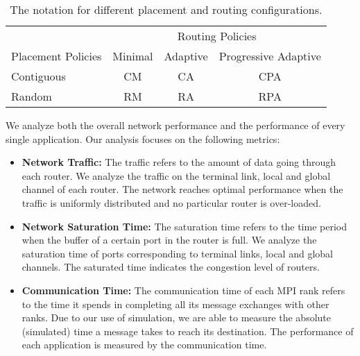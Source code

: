 
\begin{table}[ht]
\begin{center}
\caption{The notation for different placement and routing configurations.} 
\label{tab: placement routing configs}
\begin{tabular}{l c c c }
\toprule %
\toprule
&\multicolumn{3}{c}{Routing Policies} \\ 
\cmidrule(l){2-4}
Placement Policies & Minimal & Adaptive & Progressive Adaptive\\ %
\midrule %
Contiguous  &  CM   &   CA   &  CPA   \\ %
\midrule
Random  &   RM  &   RA   &  RPA   \\ 
\midrule %
\bottomrule %
\end{tabular}
\end{center}
\end{table}


We analyze both the overall network performance and the performance of every single application.
Our analysis focuses on the following metrics:
\begin{itemize}

    \item \textbf{Network Traffic:} The traffic refers to the amount of data going through each router. We analyze the traffic on the terminal link, local and global channel of each router. The network reaches optimal performance when the traffic is uniformly distributed and no particular router is over-loaded. 
            
    \item \textbf{Network Saturation Time:} The saturation time refers to the time period when the buffer of a certain port in the router is full. We analyze the saturation time of ports corresponding to terminal links, local and global channels. The saturated time indicates the congestion level of routers. 
    
    \item \textbf{Communication Time:} The communication time of each MPI rank refers to the time it spends in completing all its message exchanges with other ranks. Due to our use of simulation, we are able to measure the absolute (simulated) time a message takes to reach its destination.  The performance of each application is measured by the  communication time.
\end{itemize}

